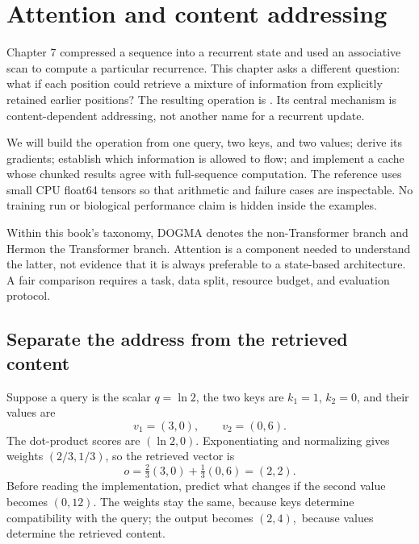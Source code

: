 \chapter{Attention and content addressing}
\label{ch:attention}

Chapter 7 compressed a sequence into a recurrent state and used an associative scan to compute a particular recurrence. This chapter asks a different question: what if each position could retrieve a mixture of information from explicitly retained earlier positions? The resulting operation is . Its central mechanism is content-dependent addressing, not another name for a recurrent update.

We will build the operation from one query, two keys, and two values; derive its gradients; establish which information is allowed to flow; and implement a cache whose chunked results agree with full-sequence computation. The reference uses small CPU float64 tensors so that arithmetic and failure cases are inspectable. No training run or biological performance claim is hidden inside the examples.

Within this book's taxonomy, DOGMA denotes the non-Transformer branch and Hermon the Transformer branch. Attention is a component needed to understand the latter, not evidence that it is always preferable to a state-based architecture. A fair comparison requires a task, data split, resource budget, and evaluation protocol.

\section{Separate the address from the retrieved content}

Suppose a query is the scalar $q=\ln2$, the two keys are $k_1=1$, $k_2=0$, and their values are
\begin{equation}
v_1=(3,0),\qquad v_2=(0,6).
\end{equation}
The dot-product scores are $(\ln2,0)$. Exponentiating and normalizing gives weights $(2/3,1/3)$, so the retrieved vector is
\begin{equation}
o=\tfrac23(3,0)+\tfrac13(0,6)=(2,2).
\label{eq:tiny}
\end{equation}
Before reading the implementation, predict what changes if the second value becomes $(0,12)$. The weights stay the same, because keys determine compatibility with the query; the output becomes $(2,4),$ because values determine the retrieved content.

